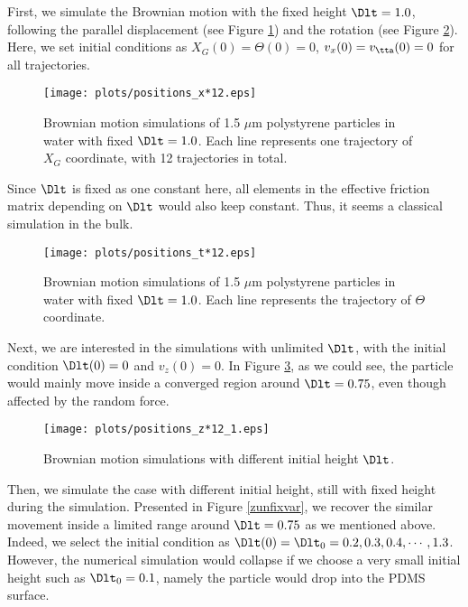 \documentclass[fleqn,10pt]{InternshipReport-ENS-PSL}
\begin{document}
First, we simulate the Brownian motion with the fixed height $\Dlt = 1.0$, following the parallel displacement (see Figure \ref{zfix_x}) and the rotation (see Figure \ref{zfix_t}). Here, we set initial conditions as $X_G (0) = \Theta (0) = 0$, $v_x (0) = v_\tta (0) = 0$ for all trajectories.

\begin{figure}[ht]
\centering
\texttt{[image: plots/positions\_x*12.eps]}
\caption{Brownian motion simulations of 1.5 $\mu$m polystyrene particles in water with fixed $\Dlt = 1.0$. Each line represents one trajectory of $X_G$ coordinate, with 12 trajectories in total.}
\label{zfix_x}
\end{figure}

Since $\Dlt$ is fixed as one constant here, all elements in the effective friction matrix depending on $\Dlt$ would also keep constant. Thus, it seems a classical simulation in the bulk.

\begin{figure}[ht]
\centering
\texttt{[image: plots/positions\_t*12.eps]}
\caption{Brownian motion simulations of 1.5 $\mu$m polystyrene particles in water with fixed $\Dlt = 1.0$. Each line represents the trajectory of $\Theta$ coordinate.}
\label{zfix_t}
\end{figure}



Next, we are interested in the simulations with unlimited $\Dlt$, with the initial condition $\Dlt (0) = 0$ and $v_z (0) = 0$. In Figure \ref{zunfix1}, as we could see, the particle would mainly move inside a converged region around $\Dlt = 0.75$, even though affected by the random force.

\begin{figure}[ht]
\centering
\texttt{[image: plots/positions\_z*12\_1.eps]}
\caption{Brownian motion simulations with different initial height $\Dlt$.}
\label{zunfix1}
\end{figure}



Then, we simulate the case with different initial height, still with fixed height during the simulation. Presented in Figure \ref{zunfixvar}, we recover the similar movement inside a limited range around $\Dlt = 0.75$ as we mentioned above. Indeed, we select the initial condition as $\Dlt (0) = \Dlt_0 = 0.2, 0.3, 0.4, \cdots, 1.3$. However, the numerical simulation would collapse if we choose a very small initial height such as $\Dlt_0 = 0.1$, namely the particle would drop into the PDMS surface.
\end{document}
